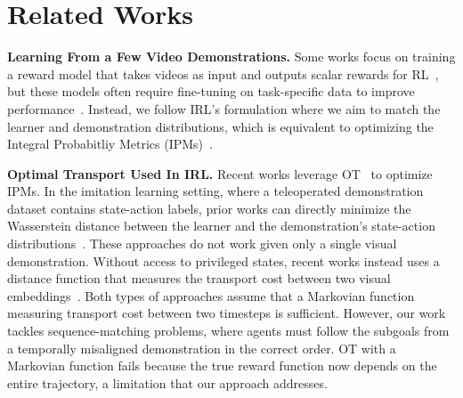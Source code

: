 \section{Related Works}
% 


\textbf{Learning From a Few Video Demonstrations.} 
Some works focus on training a reward model that takes videos as input and outputs scalar rewards for RL~\cite{sontakke2024roboclip, rank2reward}, but these models often require fine-tuning on task-specific data to improve performance~\cite{fu2024furlvisuallanguagemodelsfuzzy}. 
Instead, we follow IRL's formulation where we aim to match the learner and demonstration distributions, which is equivalent to optimizing the Integral Probabitliy Metrics (IPMs)~\cite{sun2019provably, swamy2021moments}.

\textbf{Optimal Transport Used In IRL.} Recent works leverage OT~\cite{peyré2020computationaloptimaltransport} to optimize IPMs. 
In the imitation learning setting, where a teleoperated demonstration dataset contains state-action labels, prior works can directly minimize the Wasserstein distance between the learner and the demonstration's state-action distributions~\cite{xiao2019wassersteinadversarialimitationlearning, dadashi2020primal, papagiannis2022imitation, luo2023optimal, bobrin2024alignintentsofflineimitation}.
These approaches do not work given only a single visual demonstration.
Without access to privileged states, recent works instead uses a distance function that measures the transport cost between two visual embeddings~\cite{cohen2022imitation, haldar2023teach, haldar2023watch, guzey2024see, tian2024what, liu2024imitation, fu2024robot, kedia2024oneshotimitationmismatchedexecution}.
Both types of approaches assume that a Markovian function measuring transport cost between two timesteps is sufficient. 
However, our work tackles sequence-matching problems, where agents must follow the subgoals from a temporally misaligned demonstration in the correct order. 
OT with a Markovian function fails because the true reward function now depends on the entire trajectory, a limitation that our approach addresses. 

